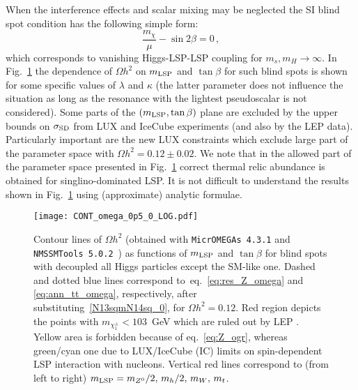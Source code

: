 \documentclass[12pt,twoside]{article}
\begin{document}
When the interference effects and scalar mixing may be neglected 
the SI blind spot condition has the following simple form:
%
\begin{equation}
\label{bs_h_0}
\frac{m_\chi}{\mu}-\sin2\beta=0\,,
\end{equation}
%
which corresponds to vanishing Higgs-LSP-LSP coupling for $m_s,m_H\to\infty$. 
In Fig.~\ref{fig:cont_om_0} the dependence of $\Omega h^2$ on $m_{\rm LSP}$ 
and $\tan\beta$ for such blind spots is shown for some specific values of 
$\lambda$ and $\kappa$ (the latter parameter does not influence the situation 
as long as the resonance with the lightest pseudoscalar is not considered).
Some parts of the $(m_{\rm LSP},\tan\beta)$ plane are excluded by the upper  
bounds on $\sigma_{\rm SD}$ from LUX \cite{LUX_SD_n} and IceCube 
\cite{IceCubeNEW} experiments (and also by the LEP data). 
Particularly important are the new LUX constraints which exclude 
large part of the parameter space with $\Omega h^2=0.12\pm0.02$.
We note that in the allowed part of the  parameter space presented 
in Fig.~\ref{fig:cont_om_0} correct thermal relic abundance is obtained for
singlino-dominated LSP.
It is not difficult to understand the 
results shown in Fig.~\ref{fig:cont_om_0} using (approximate) 
analytic formulae.
%
%
\begin{figure}
\center
\texttt{[image: CONT\_omega\_0p5\_0\_LOG.pdf]}
\caption{Contour lines of $\Omega h^2$ (obtained with 
{\tt MicrOMEGAs 4.3.1} \cite{micromegas} and 
{\tt NMSSMTools 5.0.2}~\cite{NTools1,NTools2})
as functions of $m_{\rm LSP}$ and $\tan\beta$ for blind spots 
with decoupled all Higgs particles except the SM-like one. 
Dashed and dotted blue lines correspond to~eq.~\eqref{eq:res_Z_omega} 
and \eqref{eq:ann_tt_omega}, respectively, after 
substituting~\eqref{N13sqmN14sq_0}, for $\Omega h^2=0.12$. 
Red region depicts the points with $m_{\chi_1^\pm}<103$~GeV which 
are ruled out by LEP \cite{LEPchargino}. Yellow area is forbidden because of
eq.~\eqref{eq:Z_ogr},
whereas green/cyan one due to LUX/IceCube (IC) limits on spin-dependent LSP interaction with nucleons. Vertical red lines correspond to (from left to right)
$m_{\rm LSP}=m_{Z^0}/2,\,m_h/2,\,m_W,\,m_t$.
}
\label{fig:cont_om_0}
\end{figure}
%
%
\end{document}
